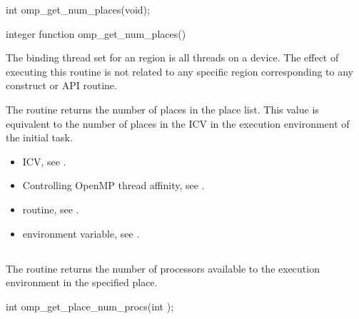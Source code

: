 \format
\begin{ccppspecific}
\begin{ompcFunction}
int omp_get_num_places(void);
\end{ompcFunction}
\end{ccppspecific}

\begin{fortranspecific}
\begin{ompfFunction}
integer function omp_get_num_places()
\end{ompfFunction}
\end{fortranspecific}

\binding
The binding thread set for an   region is 
all threads on a device. The effect of executing this routine is not 
related to any specific region corresponding to any construct or API routine.

\effect

The  routine returns the number of places in 
the place list. This value is equivalent to the number of places in the 
  ICV in the execution environment of the initial task.

\crossreferences
\begin{itemize}
\item {} ICV, see
.

\item Controlling OpenMP thread affinity, see
.

\item {} routine, see
.

\item {} environment variable, see
.
\end{itemize}



\subsection{}
\label{subsec:omp_get_place_num_procs}

\summary
The   routine returns the number of 
processors available to the execution environment in the specified place.

\format
\begin{ccppspecific}
\begin{ompcFunction}
int omp_get_place_num_procs(int );
\end{ompcFunction}
\end{ccppspecific}

